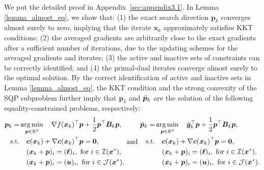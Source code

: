 \documentclass[aos]{imsart}
\numberwithin{equation}{section}
\theoremstyle{plain}
\newcommand{\michael}[1]{\textcolor{red}{Michael:\ #1}}
\newcommand{\yihang}[1]{\textcolor{blue}{Yihang:\ #1}}
\begin{document}
We put the detailed proof in Appendix~\ref{sec:appendix3.1}. In Lemma \ref{lemma_almost_eq}, we show that: (1) the exact search direction $\bm{p}_k$ converges almost surely to zero, implying that the iterate $\bm{x}_k$ approximately satisfies KKT conditions; (2) the averaged gradients are arbitrarily close to the exact gradients after a sufficient number of iterations, due to the updating schemes for the averaged gradients and iterates; (3) the active and inactive sets of constraints can be correctly identified; and (4) the primal-dual iterates converge almost surely to the optimal solution.
By the correct identification of active and inactive sets in Lemma \ref{lemma_almost_eq}, 
the KKT condition and the strong convexity of the SQP subproblem further imply that $\bm{p}_k$ and $\Bar{\bm{p}}_k$ are the solution of the following equality-constrained problems, respectively:
   \begin{equation}
      \label{eq9}
       \begin{split}
        \bm{p}_k = & \mathop{\arg \min}_{\bm{p} \in \mathbb{R}^{d}} \hspace{1em}  \nabla f(\bm{x}_k)^{\top}\bm{p}+ \frac{1}{2}\bm{p}^{\top}\bm{B}_k\bm{p},\\
        \text{s.t.} & \hspace{1em} \bm{c}(\bm{x}_k)+\nabla \bm{c}(\bm{x}_k)^{\top}\bm{p} = \bm{0},\\
        & \hspace{1em} (\bm{x}_k + \bm{p})_i = (\bm{\ell})_i,~\text{for}~ i \in \mathcal{I}(\bm{x}^{*}),\\
        & \hspace{1em} (\bm{x}_k + \bm{p})_i = (\bm{u})_i,~\text{for}~ i \in \mathcal{J}(\bm{x}^{*}),
    \end{split}  
    ~\text{and}~
       \begin{split}
        \Bar{\bm{p}}_k = & \mathop{\arg \min}_{\bm{p} \in \mathbb{R}^{d}}  \hspace{1em}  \Bar{\bm{g}}_k^{\top}\bm{p}+ \frac{1}{2}\bm{p}^{\top}\bm{B}_k\bm{p},\\
        \text{s.t.} & \hspace{1em} \bm{c}(\bm{x}_k)+\nabla \bm{c}(\bm{x}_k)^{\top}\bm{p} = \bm{0},\\
        & \hspace{1em} (\bm{x}_k + \bm{p})_i = (\bm{\ell})_i,~\text{for}~ i \in \mathcal{I}(\bm{x}^{*}),\\
        & \hspace{1em} (\bm{x}_k + \bm{p})_i = (\bm{u})_i,~\text{for}~ i \in \mathcal{J}(\bm{x}^{*}).
    \end{split}    
   \end{equation}
\end{document}
